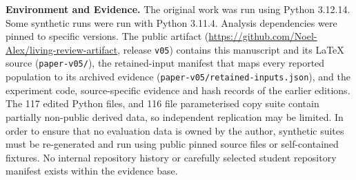 \documentclass[10pt,conference,letterpaper]{IEEEtran}
\begin{document}
\textbf{Environment and Evidence.} The original work was run using Python 3.12.14. Some synthetic runs were run with Python 3.11.4. Analysis dependencies were pinned to specific versions. The public artifact (\url{https://github.com/Noel-Alex/living-review-artifact}, release \texttt{v05}) contains this manuscript and its LaTeX source (\texttt{paper-v05/}), the retained-input manifest that maps every reported population to its archived evidence (\texttt{paper-v05/retained-inputs.json}), and the experiment code, source-specific evidence and hash records of the earlier editions. The 117 edited Python files, and 116 file parameterised copy suite contain partially non-public derived data, so independent replication may be limited. In order to ensure that no evaluation data is owned by the author, synthetic suites must be re-generated and run using public pinned source files or self-contained fixtures. No internal repository history or carefully selected student repository manifest exists within the evidence base.
\end{document}

